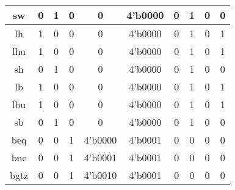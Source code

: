 \documentclass[UTF8]{ctexart}
\begin{document}
\begin{table}[H]
\begin{threeparttable}
\begin{tabular}{|c|c|c|c|c|c|c|c|c|c|}
			\hline
			sw                                       & 0                 & 1                 & 0               & 0                 & 4'b0000          & 0                & 1               & 0               & 0                 \\
			\hline
			lh                                       & 1                 & 0                 & 0               & 0                 & 4'b0000          & 0                & 1               & 0               & 1                 \\
			\hline
			lhu                                      & 1                 & 0                 & 0               & 0                 & 4'b0000          & 0                & 1               & 0               & 1                 \\
			\hline
			sh                                       & 0                 & 1                 & 0               & 0                 & 4'b0000          & 0                & 1               & 0               & 0                 \\
			\hline
			lb                                       & 1                 & 0                 & 0               & 0                 & 4'b0000          & 0                & 1               & 0               & 1                 \\
			\hline
			lbu                                      & 1                 & 0                 & 0               & 0                 & 4'b0000          & 0                & 1               & 0               & 1                 \\
			\hline
			sb                                       & 0                 & 1                 & 0               & 0                 & 4'b0000          & 0                & 1               & 0               & 0                 \\
			\hline
			beq                                      & 0                 & 0                 & 1               & 4'b0000           & 4'b0001          & 0                & 0               & 0               & 0                 \\
			\hline
			bne                                      & 0                 & 0                 & 1               & 4'b0001           & 4'b0001          & 0                & 0               & 0               & 0                 \\
			\hline
			bgtz                                     & 0                 & 0                 & 1               & 4'b0010           & 4'b0001          & 0                & 0               & 0               & 0                 \\

\end{tabular}
\end{threeparttable}
\end{table}
\end{document}
